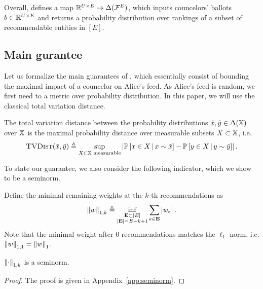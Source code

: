 Overall, \SimpleVeche{} defines a map $\mathbb R^{U \times E} \to \Delta (\mathcal F^E)$,
which inputs councelors' ballots $b \in \mathbb R^{U \times E}$
and returns a probability distribution over rankings 
of a subset of recommendable entities in $[E]$.


\subsection{Main gurantee}

Let us formalize the main guarantees of \SimpleVeche{},
which essentially consist of bounding the maximal impact of a councelor
on Alice's feed.
As Alice's feed is random, we first need to a metric over probability distribution.
In this paper, we will use the classical total variation distance.

\begin{definition}
    The total variation distance between
    the probability distributions $\tilde x, \tilde y \in \Delta(\mathbb X)$
    over $\mathbb X$ is the maximal probability distance 
    over measurable subsets $X \subset \mathbb X$, i.e.
    \begin{align*}
        \textsc{TVDist} (\tilde x, \tilde y)
        \triangleq \sup_{X \subset \mathbb X \text{ measurable}} \left\lvert{
            \mathbb P\left[x \in X \,\middle|\,x \sim \tilde x\right]
            - \mathbb P\left[y \in X \,\middle|\,y \sim \tilde y\right]
        }\right\rvert.
    \end{align*}
\end{definition}

To state our guarantee, 
we also consider the following indicator,
which we show to be a seminorm.

\begin{definition}
Define the minimal remaining weights at the $k$-th recommendations as
\begin{align}
    \left\lVert{w}\right\rVert_{1,k}
    \triangleq \inf_{\substack{{\bf E} \subset [E] \\ \left\lvert{{\bf E}}\right\rvert = E - k + 1}} 
    \sum_{e \in {\bf E}} \left\lvert{w_e}\right\rvert.
\end{align}
Note that the minimal weight after $0$ recommendations matches the $\ell_1$ norm,
i.e. $\left\lVert{w}\right\rVert_{1,1} = \left\lVert{w}\right\rVert_{1}$.
\end{definition}

\begin{proposition}
    \label{prop:seminorm}
    $\left\lVert{\cdot}\right\rVert_{1,k}$ is a seminorm.
\end{proposition}

\begin{proof}
    The proof is given in Appendix~\ref{app:seminorm}.
\end{proof}


